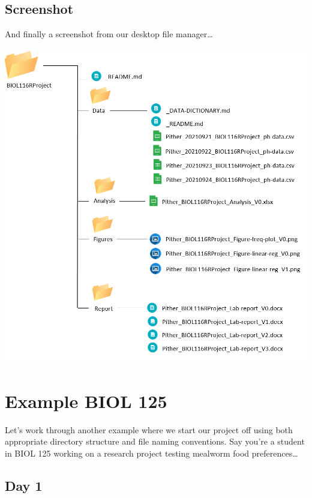 \documentclass[
]{book}
\begin{document}
\hypertarget{screenshot}{%
\subsection*{Screenshot}\label{screenshot}}

And finally a screenshot from our desktop file manager\ldots{}

\includegraphics{images/DS_biol116-directory-example.png}

\hypertarget{example-biol-125}{%
\section{Example BIOL 125}\label{example-biol-125}}

Let's work through another example where we start our project off using both appropriate directory structure and file naming conventions. Say you're a student in BIOL 125 working on a research project testing mealworm food preferences\ldots{}

\hypertarget{day-1-1}{%
\subsection*{Day 1}\label{day-1-1}}
\end{document}
